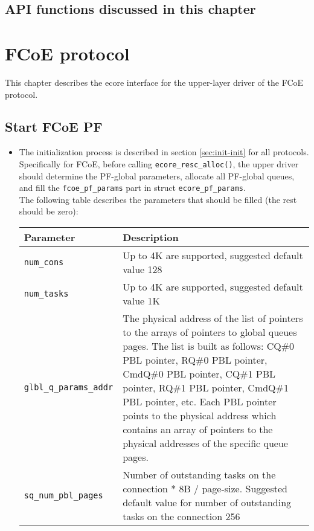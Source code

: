 \documentclass[11pt,fleqn,hidelinks,oneside]{book} %
\newcommand{\insertcode}[2]{\begin{itemize}\item[]\end{itemize}} %
\newcommand{\ChapterFuncs}{}
\newcommand{\silentfunc}[1]
{\expandafter\def\expandafter\ChapterFuncs\expandafter{\ChapterFuncs { } \insertcode{snippets/#1_generated.h}{}}}
\newenvironment{bottompar}{\par\vspace*{\fill}}{\clearpage}
\newcommand{\SpillChapterFuncs}%
{%
\section{API functions discussed in this chapter}
\ChapterFuncs{}%
\renewcommand{\ChapterFuncs}{}}
\begin{document}
\SpillChapterFuncs

\chapter{FCoE protocol}
\label{cha:fcoe}

This chapter describes the ecore interface for the upper-layer driver of the FCoE protocol.

\section{Start FCoE PF}
\silentfunc{sp_fcoe_func_start}
\silentfunc{fcoe_get_global_cmdq_cons}
\begin{itemize}
	\item The initialization process is described in section \ref{sec:init-init} for all protocols. \\
	Specifically for FCoE, before calling \texttt{ecore\_resc\_alloc()}, the upper driver should determine the PF-global parameters, allocate all PF-global queues, and fill the \texttt{fcoe\_pf\_params} part in struct \texttt{ecore\_pf\_params}. \\
	The following table describes the parameters that should be filled (the rest should be zero):
	\begin{center}
		\begin{tabular}{| l | p{10cm} |}
		\hline
		\textbf{Parameter} & \textbf{Description} \\ \hline
		\texttt{num\_cons} & Up to 4K are supported, suggested default value 128 \\ \hline
		\texttt{num\_tasks} & Up to 4K are supported, suggested default value 1K \\ \hline
		\texttt{glbl\_q\_params\_addr} & The physical address of the list of pointers to the arrays of pointers to global queues pages. \newline The list is built as follows: CQ\#0 PBL pointer, RQ\#0 PBL pointer, CmdQ\#0 PBL pointer, CQ\#1 PBL pointer, RQ\#1 PBL pointer, CmdQ\#1 PBL pointer, etc. \newline Each PBL pointer points to the physical address which contains an array of pointers to the physical addresses of the specific queue pages. \\ \hline
		\texttt{sq\_num\_pbl\_pages} & Number of outstanding tasks on the connection * 8B / page-size. \newline Suggested default value for number of outstanding tasks on the connection 256 \\ \hline

\end{tabular}
\end{center}
\end{itemize}
\end{document}
